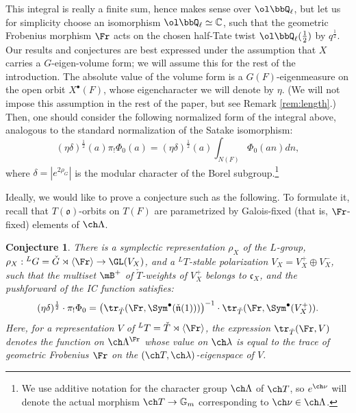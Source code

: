 \documentclass[final]{amsart}
\newtheorem{conj}[subsubsection]{Conjecture}
\theoremstyle{remark}
\theoremstyle{definition}
\numberwithin{equation}{section}
\begin{document}
\smallskip

This integral is really a finite sum, hence makes sense over $\ol\bbQ_\ell$, but let us for simplicity choose an isomorphism $\ol\bbQ_\ell \simeq \mathbb C$, such that the geometric Frobenius morphism $\Fr$ acts on the chosen half-Tate twist $\ol\bbQ_\ell(\frac{1}{2})$ by $q^\frac{1}{2}$. 
Our results and conjectures are best expressed under the assumption that $X$ carries a $G$-eigen-volume form;  we will assume this for the rest of the introduction. The absolute value of the volume form is a $G(F)$-eigenmeasure on the open orbit $X^\bullet(F)$, whose  eigencharacter we will denote by $\eta$. (We will not impose this assumption in the rest of the paper, but see Remark \ref{rem:length}.) Then, one should consider the following normalized form of the integral above, analogous to the standard normalization of the Satake isomorphism:
\begin{equation}
(\eta\delta)^\frac{1}{2}(a) \pi_! \Phi_0 (a) = (\eta\delta)^\frac{1}{2}(a)\int_{N(F)} \Phi_0(an) dn,
\end{equation}
where $\delta = |e^{2\rho_G}|$ is the modular character of the Borel subgroup.\footnote{We use additive notation for the character group $\ch\Lambda$ of $\ch T$, so $e^{\ch\nu}$ will denote the actual morphism $\ch T\to \mathbb G_m$ corresponding to $\ch\nu\in \ch\Lambda$.}


Ideally, we would like to prove a conjecture such as the following. To formulate it, recall that $T(\mathfrak o)$-orbits on $T(F)$ are parametrized by Galois-fixed (that is, $\Fr$-fixed) elements of $\ch\Lambda$.

\begin{conj}
\label{conjecture-pushforward-IC}
There is a symplectic representation $\rho_X$ of the $L$-group, $\rho_X: {^LG}=\check G \rtimes \left<\Fr\right> \to \GL(V_X)$, and a ${^LT}$-stable polarization $V_X=V_X^+\oplus V_X^-$, such that the multiset $\mB^+$ of $\check T$-weights of $V_X^+$ belongs to $\mathfrak c_X$, and the pushforward of the IC function satisfies:
 \begin{equation}
 \label{equation-pushforward-IC}
  (\eta\delta)^\frac{1}{2} \cdot \pi_! \Phi_0 = \left(\tr_{\check T}(\Fr, \Sym^\bullet (\check{\mathfrak n}(1)))\right)^{-1} \cdot \tr_{\check T}(\Fr, \Sym^\bullet (V_X^+)).
 \end{equation}
 Here, for a representation $V$ of ${^LT}=\check T\rtimes\left<\Fr\right>$, the expression $\tr_{\check T}(\Fr,V)$ denotes the function on $\ch\Lambda^{\Fr}$ whose value on $\ch\lambda$ is equal to the trace of geometric Frobenius $\Fr$ on the $(\ch T, \ch\lambda)$-eigenspace of $V$. 
\end{conj}
\end{document}
